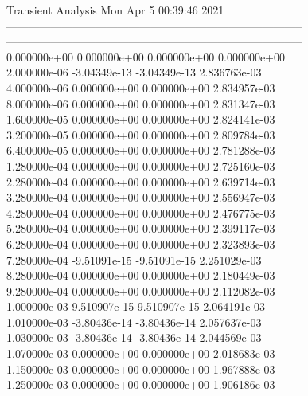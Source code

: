                                    Transient Analysis  Mon Apr  5 00:39:46  2021\\ \hline
--------------------------------------------------------------------------------\\ \hline
--------------------------------------------------------------------------------\\ 	0.000000e+00	0.000000e+00	0.000000e+00	0.000000e+00	\\ 	2.000000e-06	-3.04349e-13	-3.04349e-13	2.836763e-03	\\ 	4.000000e-06	0.000000e+00	0.000000e+00	2.834957e-03	\\ 	8.000000e-06	0.000000e+00	0.000000e+00	2.831347e-03	\\ 	1.600000e-05	0.000000e+00	0.000000e+00	2.824141e-03	\\ 	3.200000e-05	0.000000e+00	0.000000e+00	2.809784e-03	\\ 	6.400000e-05	0.000000e+00	0.000000e+00	2.781288e-03	\\ 	1.280000e-04	0.000000e+00	0.000000e+00	2.725160e-03	\\ 	2.280000e-04	0.000000e+00	0.000000e+00	2.639714e-03	\\ 	3.280000e-04	0.000000e+00	0.000000e+00	2.556947e-03	\\ 	4.280000e-04	0.000000e+00	0.000000e+00	2.476775e-03	\\ 	5.280000e-04	0.000000e+00	0.000000e+00	2.399117e-03	\\ 	6.280000e-04	0.000000e+00	0.000000e+00	2.323893e-03	\\ 	7.280000e-04	-9.51091e-15	-9.51091e-15	2.251029e-03	\\ 	8.280000e-04	0.000000e+00	0.000000e+00	2.180449e-03	\\ 	9.280000e-04	0.000000e+00	0.000000e+00	2.112082e-03	\\ 	1.000000e-03	9.510907e-15	9.510907e-15	2.064191e-03	\\ 	1.010000e-03	-3.80436e-14	-3.80436e-14	2.057637e-03	\\ 	1.030000e-03	-3.80436e-14	-3.80436e-14	2.044569e-03	\\ 	1.070000e-03	0.000000e+00	0.000000e+00	2.018683e-03	\\ 	1.150000e-03	0.000000e+00	0.000000e+00	1.967888e-03	\\ 	1.250000e-03	0.000000e+00	0.000000e+00	1.906186e-03	\\ \hline
